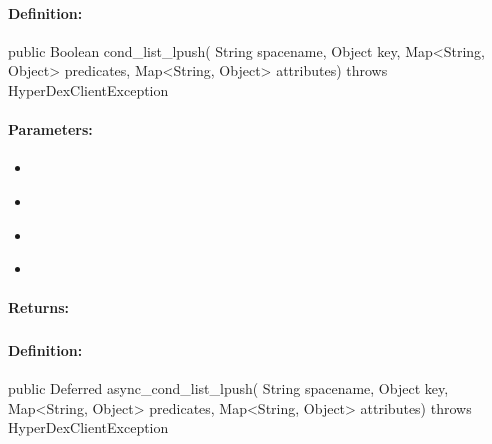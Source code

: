 \paragraph{Definition:}
\begin{javacode}
public Boolean cond_list_lpush(
        String spacename,
        Object key,
        Map<String, Object> predicates,
        Map<String, Object> attributes) throws HyperDexClientException
\end{javacode}

\paragraph{Parameters:}
\begin{itemize}[noitemsep]
\item {}\\

\item {}\\

\item {}\\

\item {}\\

\end{itemize}

\paragraph{Returns:}


\pagebreak
\subsubsection{}
\label{api:java:async_cond_list_lpush}


\paragraph{Definition:}
\begin{javacode}
public Deferred async_cond_list_lpush(
        String spacename,
        Object key,
        Map<String, Object> predicates,
        Map<String, Object> attributes) throws HyperDexClientException
\end{javacode}


